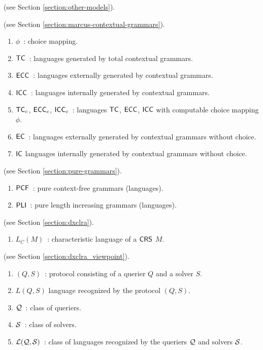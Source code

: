  (see Section \ref{section:other-models}).

 (see Section \ref{section:marcus-contextual-grammars}).

\begin{enumerate}[]
\item $\phi$\ : choice mapping.
\item $\textup{\sf TC}$\ : languages generated by total contextual grammars.
\item $\textup{\sf ECC}$\ : languages externally generated by contextual grammars.
\item $\textup{\sf ICC}$\ : languages internally generated by contextual grammars.
\item $\textup{\sf TC}_c$, $\textup{\sf ECC}_c$, $\textup{\sf ICC}_c$\ : languages $\textup{\sf TC}$, $\textup{\sf ECC}$, $\textup{\sf ICC}$ with computable choice mapping $\phi$.
\item $\textup{\sf EC}$\ : languages externally generated by contextual grammars without choice.
\item $\textup{\sf IC}$ languages internally generated by contextual grammars without choice.
\end{enumerate}

 (see Section \ref{section:pure-grammars}).

\begin{enumerate}[]
\item $\textup{\sf PCF}$\ : pure context-free grammars (languages).
\item $\textup{\sf PLI}$\ : pure length increasing grammars (languages).
\end{enumerate}

 (see Section \ref{section:dxclra}).

\begin{enumerate}[]
\item $L_C(M)$\ : characteristic language of a $\textup{\sf CRS\/}$ $M$.
\end{enumerate}

 (see Section \ref{section:dxclra_viewpoint}).

\begin{enumerate}[]
\item $(Q, S)$\ : protocol consisting of a querier $Q$ and a solver $S$.
\item $L(Q, S)$ language recognized by the protocol $(Q, S)$.
\item $\mathcal{Q}$\ : class of queriers.
\item $\mathcal{S}$\ : class of solvers.
\item ${\cal L}(\mathcal{Q}, \mathcal{S})$\ : class of languages recognized by the queriers $\mathcal{Q}$ and solvers $\mathcal{S}$.
\end{enumerate}

